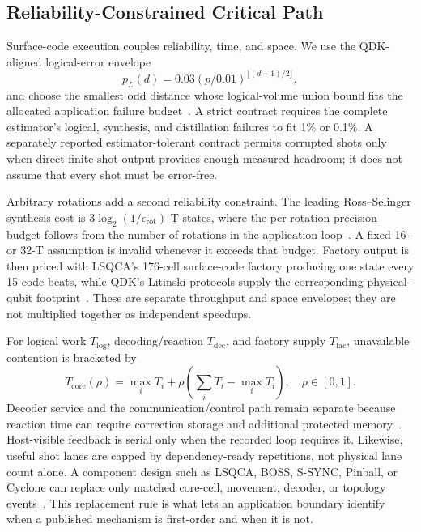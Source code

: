 \subsection{Reliability-Constrained Critical Path}

Surface-code execution couples reliability, time, and space. We use the QDK-aligned logical-error envelope
\[
p_L(d)=0.03\left(p/0.01\right)^{\lfloor(d+1)/2\rfloor},
\]
and choose the smallest odd distance whose logical-volume union bound fits the allocated application failure budget~\cite{azurequantumresourceestimatordocs}. A strict contract requires the complete estimator's logical, synthesis, and distillation failures to fit 1\% or 0.1\%. A separately reported estimator-tolerant contract permits corrupted shots only when direct finite-shot output provides enough measured headroom; it does not assume that every shot must be error-free.

Arbitrary rotations add a second reliability constraint. The leading Ross--Selinger synthesis cost is $3\log_2(1/\epsilon_{\mathrm{rot}})$ T states, where the per-rotation precision budget follows from the number of rotations in the application loop~\cite{rossselinger2016}. A fixed 16- or 32-T assumption is invalid whenever it exceeds that budget. Factory output is then priced with LSQCA's 176-cell surface-code factory producing one state every 15 code beats, while QDK's Litinski protocols supply the corresponding physical-qubit footprint~\cite{lsqca2025,azurequantumresourceestimatordocs}. These are separate throughput and space envelopes; they are not multiplied together as independent speedups.

For logical work $T_{\mathrm{log}}$, decoding/reaction $T_{\mathrm{dec}}$, and factory supply $T_{\mathrm{fac}}$, unavailable contention is bracketed by
\[
T_{\mathrm{core}}(\rho)=\max_i T_i+
\rho\left(\sum_i T_i-\max_i T_i\right),
\quad \rho\in[0,1].
\]
Decoder service and the communication/control path remain separate because reaction time can require correction storage and additional protected memory~\cite{khalid2025reaction}. Host-visible feedback is serial only when the recorded loop requires it. Likewise, useful shot lanes are capped by dependency-ready repetitions, not physical lane count alone. A component design such as LSQCA, BOSS, S-SYNC, Pinball, or Cyclone can replace only matched core-cell, movement, decoder, or topology events~\cite{lsqca2025,boss2025,ssync2025,pinball2026,cyclone2026}. This replacement rule is what lets an application boundary identify when a published mechanism is first-order and when it is not.
